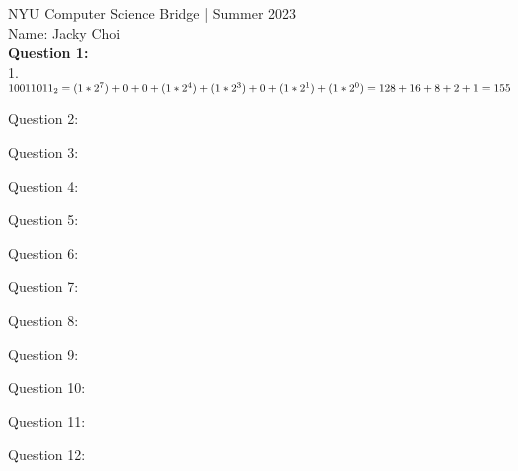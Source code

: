 \documentclass{article}
\begin{document}
\noindent NYU Computer Science Bridge | Summer 2023\\
Name: Jacky Choi\\

\noindent \textbf{Question 1:}\\
1. $ 10011011_{2} = (1*2^7) + 0 + 0 + (1*2^4) + (1*2^3) + 0 +(1*2^1) + (1*2^0) \newline = 128 + 16 + 8 + 2 + 1 \newline = 155 $
\pagebreak

\noindent Question 2:\\

\pagebreak

\noindent Question 3:\\

\pagebreak

\noindent Question 4:\\

\pagebreak

\noindent Question 5:\\

\pagebreak

\noindent Question 6:\\

\pagebreak

\noindent Question 7:\\

\pagebreak

\noindent Question 8:\\

\pagebreak

\noindent Question 9:\\

\pagebreak

\noindent Question 10:\\

\pagebreak

\noindent Question 11:\\

\pagebreak

\noindent Question 12:\\
\end{document}

